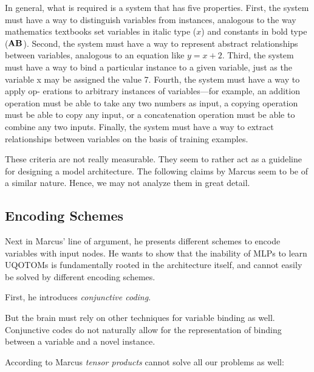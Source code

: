 \documentclass[../../main.tex]{subfiles}
\begin{document}
\begin{citecallout}
    In general, what is required is a system that has five properties. First,
    the system must have a way to distinguish variables from instances,
    analogous to the way mathematics textbooks set variables in italic type
    ($x$) and constants in bold type ($\bf{AB}$). Second, the system must have a way
    to represent abstract relationships between variables, analogous to an
    equation like $y = x + 2$. Third, the system must have a way to bind a
    particular instance to a given variable, just as the variable x may be
    assigned the value 7. Fourth, the system must have a way to apply op-
    erations to arbitrary instances of variables—for example, an addition
    operation must be able to take any two numbers as input, a copying
    operation must be able to copy any input, or a concatenation operation
    must be able to combine any two inputs. Finally, the system must have a
    way to extract relationships between variables on the basis of training
    examples.
\end{citecallout}

\begin{critique}
    These criteria are not really measurable. They seem to rather act as a guideline for designing a model architecture. The following claims by Marcus seem to be of a similar nature. Hence, we may not analyze them in great detail.
\end{critique}

\subsection{Encoding Schemes}
Next in Marcus' line of argument, he presents different schemes to encode variables with input nodes. He wants to show that the inability of MLPs to learn UQOTOMs is fundamentally rooted in the architecture itself, and cannot easily be solved by different encoding schemes.

First, he introduces \emph{conjunctive coding}.

\begin{citecallout}
    But the brain must rely on other techniques for variable binding as
    well. Conjunctive codes do not naturally allow for the representation of
    binding between a variable and a novel instance.
\end{citecallout}

According to Marcus \emph{tensor products} cannot solve all our problems as well:
\end{document}
